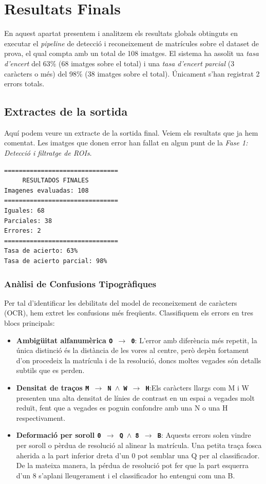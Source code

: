 
\section{Resultats Finals}
En aquest apartat presentem i analitzem els resultats globals obtinguts en executar el \textit{pipeline} de detecció i reconeixement de matrícules sobre el dataset de prova, el qual compta amb un total de 108 imatges.
El sistema ha assolit ua \textit{tasa d'encert} del 63\% (68 imatges sobre el total) i una \textit{tasa d'encert parcial} (3 caràcters o més) del 98\% (38 imatges sobre el total). Únicament s'han registrat 2 errors totals.
\subsection{Extractes de la sortida}    
Aquí podem veure un extracte de la sortida final. Veiem els resultats que ja hem comentat. Les imatges que donen error han fallat en algun punt de la \textit{Fase 1: Detecció i filtratge de ROIs}.
\begin{verbatim}
===============================
     RESULTADOS FINALES      
Imagenes evaluadas: 108
===============================
Iguales: 68
Parciales: 38
Errores: 2
===============================
Tasa de acierto: 63%
Tasa de acierto parcial: 98%
\end{verbatim}
\subsubsection{Anàlisi de Confusions Tipogràfiques}
Per tal d'identificar les debilitats del model de reconeixement de caràcters (OCR), hem extret les confusions més freqüents. Classifiquem els errors en tres blocs principals:
\begin{itemize}
    \item \textbf{Ambigüitat alfanumèrica \texttt{O $\rightarrow$ 0}}: L'error amb diferència més repetit, la única distinció és la distància de les vores al centre, però depèn fortament d'on procedeix la matrícula i de la resolució, doncs moltes vegades són detalls subtils que es perden.
    \item \textbf{Densitat de traços \texttt{M $\rightarrow$ N $\wedge$ W $\rightarrow$ H}}:Els caràcters llargs com M i W presenten una alta densitat de línies de contrast en un espai a vegades molt reduït, fent que a vegades es poguin confondre amb una N o una H respectivament.
    \item \textbf{Deformació per soroll \texttt{0 $\rightarrow$ Q $\wedge$ 8 $\rightarrow$ B}}: Aquests errors solen vindre per soroll o pèrdua de resolució al alinear la matrícula. Una petita traça fosca aherida a la part inferior dreta d'un 0 pot semblar una Q per al classificador. De la mateixa manera, la pérdua de resolució pot fer que la part esquerra d'un 8 s'aplani lleugerament i el classificador ho entengui com una B.
\end{itemize}

